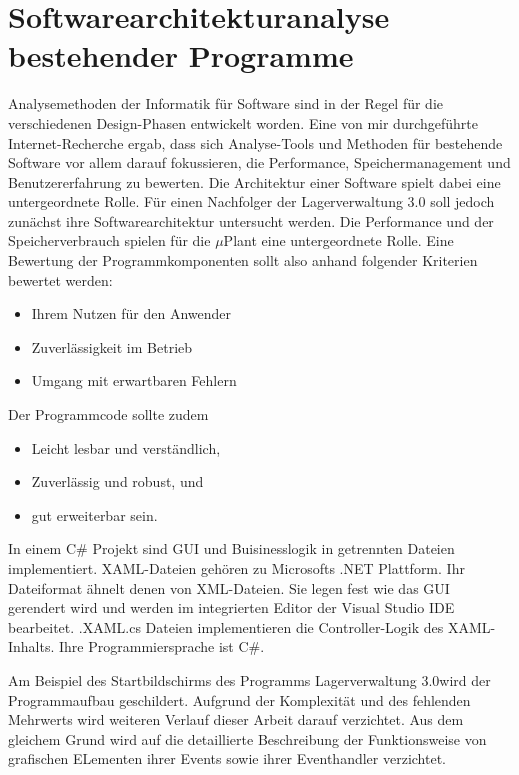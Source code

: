 \chapter{Softwarearchitekturanalyse bestehender Programme}\label{SoftwareArchitektur}

    Analysemethoden der Informatik für Software sind in der Regel für die verschiedenen Design-Phasen entwickelt worden.
    Eine von mir durchgeführte Internet-Recherche ergab, dass sich Analyse-Tools und Methoden für bestehende Software vor
    allem darauf fokussieren, die Performance, Speichermanagement und Benutzererfahrung zu bewerten.
    Die Architektur einer Software spielt dabei eine untergeordnete Rolle.
    Für einen Nachfolger der Lagerverwaltung 3.0 soll jedoch zunächst ihre Softwarearchitektur untersucht werden.
    Die Performance und der Speicherverbrauch spielen für die $\mu$Plant eine untergeordnete Rolle.
    Eine Bewertung der Programmkomponenten sollt also anhand folgender Kriterien bewertet werden:

    \begin{itemize}
        \item Ihrem Nutzen für den Anwender
        \item Zuverlässigkeit im Betrieb
        \item Umgang mit erwartbaren Fehlern
    \end{itemize}

    Der Programmcode sollte zudem
    \begin{itemize}
        \item Leicht lesbar und verständlich,
        \item Zuverlässig und robust, und
        \item gut erweiterbar sein.
    \end{itemize}
    In einem C$\#$ Projekt sind GUI und Buisinesslogik in getrennten Dateien implementiert.
    XAML-Dateien gehören zu Microsofts .NET Plattform. 
    Ihr Dateiformat ähnelt denen von XML-Dateien. 
    Sie legen fest wie das GUI gerendert wird und werden im integrierten Editor der Visual Studio IDE bearbeitet.
    .XAML.cs Dateien implementieren die Controller-Logik des XAML-Inhalts. 
    Ihre Programmiersprache ist C$\#$.

    Am Beispiel des Startbildschirms des Programms \glqq Lagerverwaltung 3.0\grqq wird der Programmaufbau geschildert.
    Aufgrund der Komplexität und des fehlenden Mehrwerts wird weiteren Verlauf dieser Arbeit darauf verzichtet.
    Aus dem gleichem Grund wird auf die detaillierte Beschreibung der Funktionsweise von grafischen ELementen ihrer Events
    sowie ihrer Eventhandler verzichtet.


